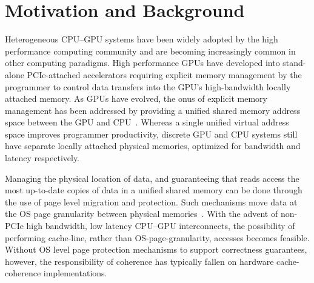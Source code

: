 \vspace{-.1in}
\section{Motivation and Background}
\label{background}

Heterogeneous CPU--GPU systems have been widely
adopted by the high performance computing community 
and are becoming increasingly common in other computing paradigms.  High performance GPUs have 
developed into stand-alone PCIe-attached accelerators requiring explicit memory 
management by the programmer to control data transfers into the GPU's 
high-bandwidth locally attached memory. As GPUs have evolved, the onus of 
explicit memory management has been addressed by providing a unified shared
memory address space between the GPU and CPU~\cite{UVM,HSA}.  Whereas a single 
unified virtual address space improves programmer productivity, discrete GPU and 
CPU systems still have separate locally attached physical memories, optimized for 
bandwidth and latency respectively. 

Managing the physical location of data, and guaranteeing that reads access 
the most up-to-date copies of 
data in a unified shared memory can be done through the use of page level 
migration and protection. Such mechanisms move data at the OS page granularity between 
physical memories~\cite{UVM}.  With the advent of non-PCIe high bandwidth, low latency
CPU--GPU interconnects, the possibility of performing cache-line, rather than OS-page-granularity, accesses
becomes feasible.  Without OS level page protection
mechanisms to support correctness guarantees, however,  the responsibility of coherence
has typically fallen on hardware cache-coherence implementations.


